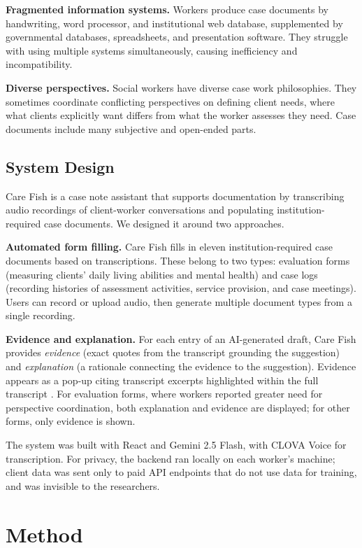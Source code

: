 \documentclass{article}
\begin{document}
\textbf{Fragmented information systems.} Workers produce case documents by handwriting, word processor, and institutional web database, supplemented by governmental databases, spreadsheets, and presentation software. They struggle with using multiple systems simultaneously, causing inefficiency and incompatibility.

\textbf{Diverse perspectives.} Social workers have diverse case work philosophies. They sometimes coordinate conflicting perspectives on defining client needs, where what clients explicitly want differs from what the worker assesses they need. Case documents include many subjective and open-ended parts.

\subsection{System Design}

Care Fish is a case note assistant that supports documentation by transcribing audio recordings of client-worker conversations and populating institution-required case documents. We designed it around two approaches.

\textbf{Automated form filling.} Care Fish fills in eleven institution-required case documents based on transcriptions. These belong to two types: evaluation forms (measuring clients' daily living abilities and mental health) and case logs (recording histories of assessment activities, service provision, and case meetings). Users can record or upload audio, then generate multiple document types from a single recording.

\textbf{Evidence and explanation.} For each entry of an AI-generated draft, Care Fish provides \textit{evidence} (exact quotes from the transcript grounding the suggestion) and \textit{explanation} (a rationale connecting the evidence to the suggestion). Evidence appears as a pop-up citing transcript excerpts highlighted within the full transcript \citep{nguyen2024human}. For evaluation forms, where workers reported greater need for perspective coordination, both explanation and evidence are displayed; for other forms, only evidence is shown.

The system was built with React and Gemini 2.5 Flash, with CLOVA Voice for transcription. For privacy, the backend ran locally on each worker's machine; client data was sent only to paid API endpoints that do not use data for training, and was invisible to the researchers.

\section{Method}
\end{document}
